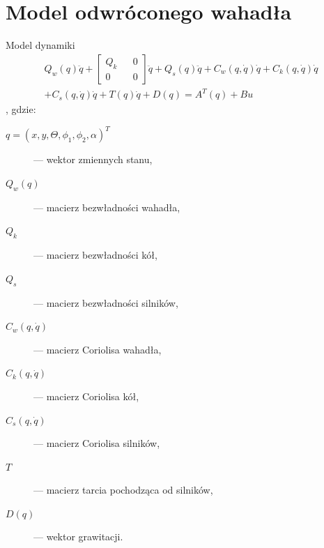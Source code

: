 \section{Model odwróconego wahadła}
\begin{frame}[allowframebreaks]{Model dynamiki}
  \begin{align} \nonumber
    Q_w(q)\ddot{q}+
    \begin{bmatrix}
      Q_k && 0 \\
      0   && 0
    \end{bmatrix}
    \ddot{q}+
    Q_s(q)\ddot{q}
    +C_w(q, \dot{q})
    \dot{q}+C_k(q, \dot{q})\dot{q}\\ \nonumber 
    +C_s(q, \dot{q})\dot{q}
    +T(q)\dot{q}+D(q)=A^T(q)+Bu
  \end{align}, gdzie:
  \begin{description}
  	\item[$q=(x, y, \Theta, \phi_1, \phi_2, \alpha )^T$] --- wektor zmiennych stanu,
  	\item[$Q_w(q)$] --- macierz bezwładności wahadła,
  	\item[$Q_k$] --- macierz bezwładności kół,
  	\item[$Q_s$] --- macierz bezwładności silników,
  	\item[$C_w(q, \dot{q})$] --- macierz Coriolisa wahadła,
  	\item[$C_k(q, \dot{q})$] --- macierz Coriolisa kół,
  	\item[$C_s(q, \dot{q})$] --- macierz Coriolisa silników,
  	\item[$T$]               --- macierz tarcia pochodząca od silników,
  	\item[$D(q)$]            --- wektor grawitacji.
  \end{description}
  
\end{frame}

